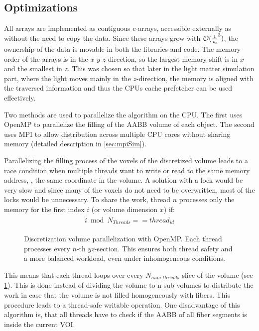 \subsection{Optimizations}\label{sec:dvOpti}
%
All arrays are implemented as contiguous c-arrays, accessible externally as  without the need to copy the data.
Since these arrays grow with $\mathcal{O}(\frac{1}{\textnormal{$\mathit{v_{s}}$}}^3)$, the ownership of the data is movable in both the \cpp{} libraries and \python{} code.
The memory order of the arrays is in the $x\text{-}y\text{-}z$ direction, so the largest memory shift is in $x$ and the smallest in $z$.
This was chosen so that later in the light matter simulation part, where the light moves mainly in the $z$-direction, the memory is aligned with the traversed information and thus the \acp{CPU} cache prefetcher can be used effectively.
\par
%
Two methods are used to parallelize the algorithm on the \ac{CPU}.
The first uses \ac{OpenMP} to parallelize the filling of the \ac{AABB} volume of each object.
The second uses \ac{MPI} to allow distribution across multiple \ac{CPU} cores without sharing memory (detailed description in \cref{sec:mpiSim}).
\par
%
Parallelizing the filling process of the voxels of the discretized volume leads to a race condition when multiple threads want to write or read to the same memory address, \ie{}, the same coordinate in the volume.
A solution with a lock would be very slow and since many of the voxels do not need to be overwritten, most of the locks would be unnecessary.
To share the work, thread $n$ processes only the memory for the first index $i$ (or volume dimension $x$) if:
%
\begin{align}
\begin{split}
    i \bmod N_{\mathit{Threads}} == \mathit{thread}_{\mathit{id}}
\end{split}
\end{align}
%
\begin{figure}[!t]
\centering
\setlength{\tikzwidth}{0.5\textwidth}
\caption{Discretization volume parallelization with \ac{OpenMP}. Each thread processes every $n$-th $yz$-section. This ensures both thread safety and a more balanced workload, even under inhomogeneous conditions.}
\label{fig:discVolThread}
\end{figure}
% 
This means that each thread loops over every $N_{\mathit{num\_threads}}$ slice of the volume (see \cref{fig:discVolThread}).
This is done instead of dividing the volume to n sub volumes to distribute the work in case that the volume is not filled homogeneously with fibers.
This procedure leads to a thread-safe writable operation.
One disadvantage of this algorithm is, that all threads have to check if the \ac{AABB} of all fiber segments is inside the current \ac{VOI}.
% 
% 
%
